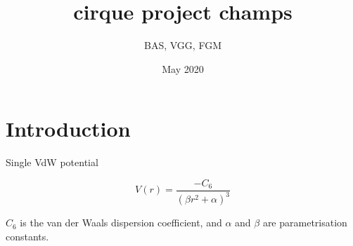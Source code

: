 \documentclass{article}
\title{cirque project champs}
\author{BAS, VGG, FGM}
\date{May 2020}
\begin{document}
\maketitle

\section{Introduction}


Single VdW potential

\begin{equation}
    V(r) = \frac{- C_6}{(\beta r^2 + \alpha)^3}
\end{equation}

$C_6$ is the van der Waals dispersion coefficient, and $\alpha$ and $\beta$ are parametrisation constants.
\end{document}
